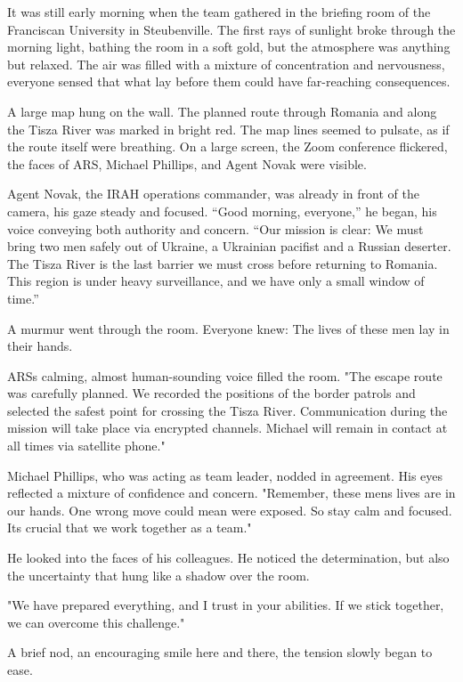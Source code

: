 \documentclass[
]{article}
\begin{document}
It was still early morning when the team gathered in the briefing room of the Franciscan University in Steubenville. The first rays of sunlight broke through the morning light, bathing the room in a soft gold, but the atmosphere was anything but relaxed. The air was filled with a mixture of concentration and nervousness, everyone sensed that what lay before them could have far-reaching consequences.

A large map hung on the wall. The planned route through Romania and along the Tisza River was marked in bright red. The map lines seemed to pulsate, as if the route itself were breathing. On a large screen, the Zoom conference flickered, the faces of ARS, Michael Phillips, and Agent Novak were visible.

Agent Novak, the IRAH operations commander, was already in front of the camera, his gaze steady and focused. ``Good morning, everyone,'' he began, his voice conveying both authority and concern. ``Our mission is clear: We must bring two men safely out of Ukraine, a Ukrainian pacifist and a Russian deserter. The Tisza River is the last barrier we must cross before returning to Romania. This region is under heavy surveillance, and we have only a small window of time.''

A murmur went through the room. Everyone knew: The lives of these men lay in their hands.

ARS\textquotesingle s calming, almost human-sounding voice filled the room. "The escape route was carefully planned. We recorded the positions of the border patrols and selected the safest point for crossing the Tisza River. Communication during the mission will take place via encrypted channels. Michael will remain in contact at all times via satellite phone."

Michael Phillips, who was acting as team leader, nodded in agreement. His eyes reflected a mixture of confidence and concern. "Remember, these men\textquotesingle s lives are in our hands. One wrong move could mean we\textquotesingle re exposed. So stay calm and focused. It\textquotesingle s crucial that we work together as a team."

He looked into the faces of his colleagues. He noticed the determination, but also the uncertainty that hung like a shadow over the room.

"We have prepared everything, and I trust in your abilities. If we stick together, we can overcome this challenge."

A brief nod, an encouraging smile here and there, the tension slowly began to ease.
\end{document}

